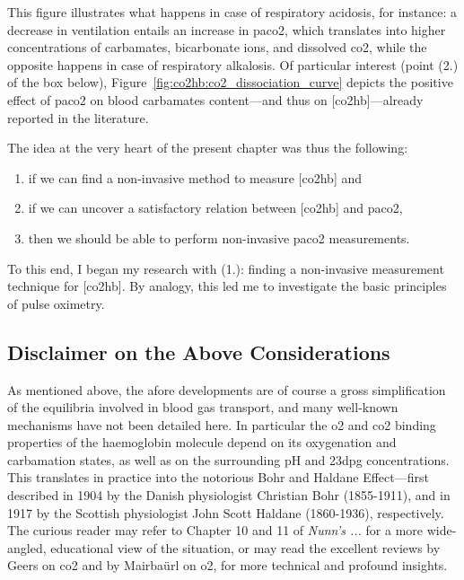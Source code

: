 This figure illustrates what happens in case of respiratory acidosis, for instance: a decrease in ventilation entails an increase in \gls{paco2}, which translates into higher concentrations of carbamates, bicarbonate ions, and dissolved \gls{co2}, while the opposite happens in case of respiratory alkalosis. Of particular interest (point (2.) of the box below), Figure~\ref{fig:co2hb:co2_dissociation_curve} depicts the positive effect of \gls{paco2} on blood carbamates content---and thus on [\gls{co2hb}]---already reported in the literature\cite{bauer1972, perrella1975a, gros1976}.
\begin{keypointbox}
	The idea at the very heart of the present chapter was thus the following:
	\begin{enumerate}
		\item if we can find a non-invasive method to measure [\gls{co2hb}] and
		\item if we can uncover a satisfactory relation between [\gls{co2hb}] and \gls{paco2},
		\item then we should be able to perform non-invasive \gls{paco2} measurements.
	\end{enumerate}
	To this end, I began my research with (1.): finding a non-invasive measurement technique for [\gls{co2hb}]. By analogy, this led me to investigate the basic principles of pulse oximetry.
\end{keypointbox}

\subsection{Disclaimer on the Above Considerations}\label{sect:co2hb:abg_disclaimer}

As mentioned above, the afore developments are of course a gross simplification of the equilibria involved in blood gas transport, and many well-known mechanisms have not been detailed here. In particular the \gls{o2} and \gls{co2} binding properties of the haemoglobin molecule depend on its oxygenation and carbamation states, as well as on the surrounding pH and \gls{23dpg} concentrations. This translates in practice into the notorious Bohr and Haldane Effect---first described in 1904 by the Danish physiologist Christian Bohr (1855-1911)\cite{bohr1904}, and in 1917 by the Scottish physiologist John Scott Haldane (1860-1936), respectively. The curious reader may refer to Chapter 10 and 11 of \textit{Nunn's ...}\cite{nunns} for a more wide-angled, educational view of the situation, or may read the excellent reviews by Geers \etal{} on \gls{co2}\cite{geers2000} and by Mairbaürl \etal{} on \gls{o2}\cite{mairbaurl2012}, for more technical and profound insights.

